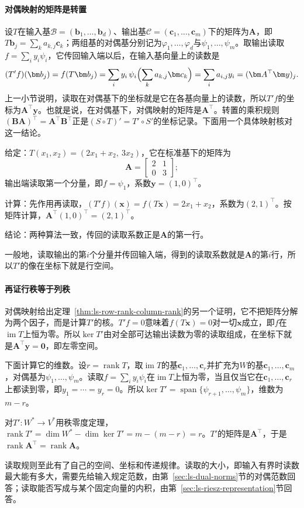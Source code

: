 \paragraph{对偶映射的矩阵是转置}
设$T$在输入基$\mathcal B=(\bm b_1,\ldots,\bm b_d)$、输出基$\mathcal C=(\bm c_1,\ldots,\bm c_m)$下的矩阵为$\bm A$，即$T\bm b_j=\sum_ka_{k,j}\bm c_k$；两组基的对偶基分别记为$\varphi_1,\ldots,\varphi_d$与$\psi_1,\ldots,\psi_m$。取输出读取$f=\sum_iy_i\psi_i$，它传回输入端以后，在输入基向量上的读数是
\[
 (T'f)(\bm b_j)=f(T\bm b_j)
 =\sum_iy_i\,\psi_i\Bigl(\sum_ka_{k,j}\bm c_k\Bigr)
 =\sum_ia_{i,j}y_i=(\bm A^\top\bm y)_j .
\]
上一小节说明，读取在对偶基下的坐标就是它在各基向量上的读数，所以$T'f$的坐标为$\bm A^\top\bm y$。也就是说，在对偶基下，对偶映射的矩阵是$\bm A^\top$。转置的乘积规则$(\bm B\bm A)^\top=\bm A^\top\bm B^\top$正是$(S\circ T)'=T'\circ S'$的坐标记录。下面用一个具体映射核对这一结论。
\begin{example}[把输出的第一个分量读取传回输入端]
\label{ex:ls-dual-map-first-component}
给定：$T(x_1,x_2)=(2x_1+x_2,\ 3x_2)$，它在标准基下的矩阵为
\[
 \bm A=\begin{bmatrix}2&1\\0&3\end{bmatrix};
\]
输出端读取第一个分量，即$f=\psi_1$，系数$\bm y=(1,0)^\top$。

计算：先作用再读取，$(T'f)(\bm x)=f(T\bm x)=2x_1+x_2$，系数为$(2,1)^\top$。按矩阵计算，$\bm A^\top(1,0)^\top=(2,1)^\top$。

结论：两种算法一致，传回的读取系数正是$\bm A$的第一行。
\end{example}
一般地，读取输出的第$i$个分量并传回输入端，得到的读取系数就是$\bm A$的第$i$行，所以$T'$的像在坐标下就是行空间。

\paragraph{再证行秩等于列秩}
对偶映射给出定理~\ref{thm:ls-row-rank-column-rank}的另一个证明，它不把矩阵分解为两个因子，而是计算$T'$的核。$T'f=0$意味着$f(T\bm x)=0$对一切$\bm x$成立，即$f$在$\operatorname{im}T$上恒为零。所以$\ker T'$由对全部可达输出读数为零的读取组成，在坐标下就是$\bm A^\top\bm y=\bm0$，即左零空间。

下面计算它的维数。设$r=\operatorname{rank}T$，取$\operatorname{im}T$的基$\bm c_1,\ldots,\bm c_r$并扩充为$W$的基$\bm c_1,\ldots,\bm c_m$，对偶基为$\psi_1,\ldots,\psi_m$。读取$f=\sum_iy_i\psi_i$在$\operatorname{im}T$上恒为零，当且仅当它在$\bm c_1,\ldots,\bm c_r$上都读到零，即$y_1=\cdots=y_r=0$。所以$\ker T'=\operatorname{span}\{\psi_{r+1},\ldots,\psi_m\}$，维数为$m-r$。

对$T':W^*\to V^*$用秩零度定理，$\operatorname{rank}T'=\dim W^*-\dim\ker T'=m-(m-r)=r$。$T'$的矩阵是$\bm A^\top$，于是$\operatorname{rank}\bm A^\top=\operatorname{rank}\bm A$。

读取规则至此有了自己的空间、坐标和传递规律。读取的大小，即输入有界时读数最大能有多大，需要先给输入规定范数，由第~\ref{sec:ls-dual-norms}节的对偶范数回答；读取能否写成与某个固定向量的内积，由第~\ref{sec:ls-riesz-representation}节回答。
